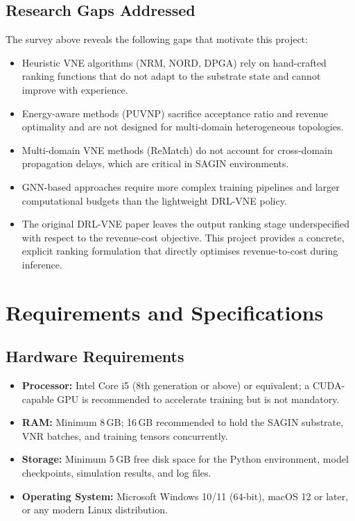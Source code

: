 \documentclass[12pt,a4paper]{report}
\begin{document}
\section{Research Gaps Addressed}

The survey above reveals the following gaps that motivate this project:
\begin{itemize}[leftmargin=*]
  \item Heuristic VNE algorithms (NRM, NORD, DPGA) rely on hand-crafted ranking functions that
        do not adapt to the substrate state and cannot improve with experience.
  \item Energy-aware methods (PUVNP) sacrifice acceptance ratio and revenue optimality and are
        not designed for multi-domain heterogeneous topologies.
  \item Multi-domain VNE methods (ReMatch) do not account for cross-domain propagation delays,
        which are critical in SAGIN environments.
  \item GNN-based approaches require more complex training pipelines and larger computational
        budgets than the lightweight DRL-VNE policy.
  \item The original DRL-VNE paper \cite{zhang2022drl} leaves the output ranking stage
        underspecified with respect to the revenue-cost objective. This project provides a
        concrete, explicit ranking formulation that directly optimises revenue-to-cost during
        inference.
\end{itemize}

\chapter{Requirements and Specifications}

\section{Hardware Requirements}

\begin{itemize}[leftmargin=*]
  \item \textbf{Processor:} Intel Core i5 (8th generation or above) or equivalent; a
        CUDA-capable GPU is recommended to accelerate training but is not mandatory.
  \item \textbf{RAM:} Minimum 8\,GB; 16\,GB recommended to hold the SAGIN substrate, VNR
        batches, and training tensors concurrently.
  \item \textbf{Storage:} Minimum 5\,GB free disk space for the Python environment, model
        checkpoints, simulation results, and log files.
  \item \textbf{Operating System:} Microsoft Windows 10/11 (64-bit), macOS 12 or later, or
        any modern Linux distribution.
\end{itemize}
\end{document}
